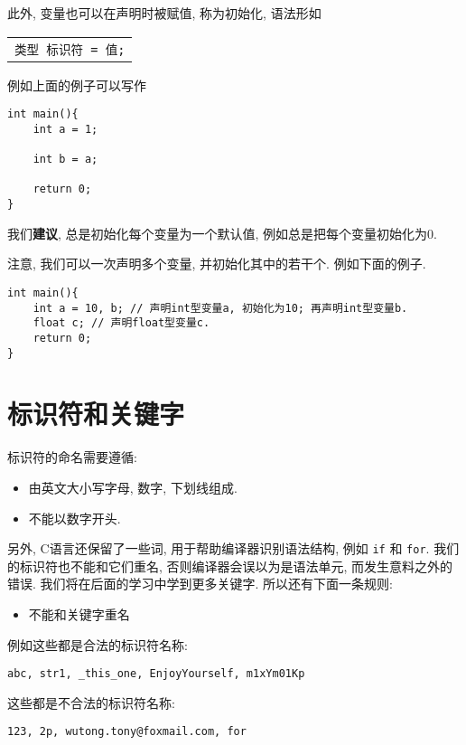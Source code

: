         此外, 变量也可以在声明时被赋值, 称为初始化, 语法形如
        \begin{center}
        \begin{longtable}{l}
            \texttt{类型~标识符 = 值;}
        \end{longtable}
        \end{center}

        例如上面的例子可以写作
\begin{lstlisting}
int main(){
    int a = 1;

    int b = a;

    return 0;
}
\end{lstlisting}

        我们\textbf{建议}, 总是初始化每个变量为一个默认值, 例如总是把每个变量初始化为0.

        注意, 我们可以一次声明多个变量, 并初始化其中的若干个. 例如下面的例子.
\begin{lstlisting}
int main(){
    int a = 10, b; // 声明int型变量a, 初始化为10; 再声明int型变量b.
    float c; // 声明float型变量c.
    return 0;
}
\end{lstlisting}
    
    \section{标识符和关键字} \label{标识符和关键字}
        标识符的命名需要遵循:
        \begin{itemize}
            \item 由英文大小写字母, 数字, 下划线组成.
            \item 不能以数字开头.
        \end{itemize}

        另外, C语言还保留了一些词, 用于帮助编译器识别语法结构, 例如 \texttt{if} 和 \texttt{for}. 我们的标识符也不能和它们重名, 否则编译器会误以为是语法单元, 而发生意料之外的错误. 我们将在后面的学习中学到更多关键字. 所以还有下面一条规则:
        \begin{itemize}
            \item 不能和关键字重名
        \end{itemize}

        例如这些都是合法的标识符名称:
        \begin{center}
            \texttt{abc, str1,  \_this\_one, EnjoyYourself, m1xYm01Kp}
        \end{center}
        
        这些都是不合法的标识符名称:
        \begin{center}
            \texttt{123, 2p, wutong.tony@foxmail.com, for}
        \end{center}

